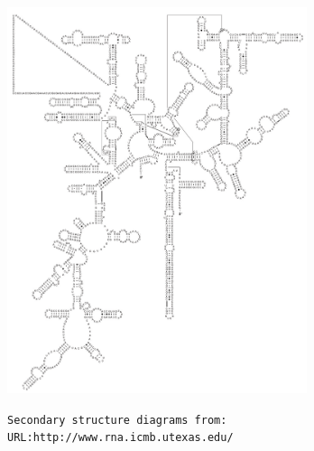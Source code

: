\documentclass[landscape]{slides}
\begin{document}
\begin{slide}
\begin{center}
\includegraphics[height=4.45in]{figs/zmays_16S_man}
\end{center}

\begin{flushright}
\tiny{\texttt{Secondary structure diagrams from:}} \\
\tiny{\texttt{URL:http://www.rna.icmb.utexas.edu/}}
\end{flushright}
\vfill
\end{slide}
\end{document}
